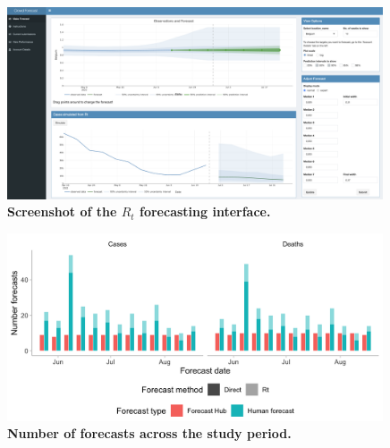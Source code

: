 \documentclass[10pt,a4paper,twocolumn]{article}
\begin{document}
\begin{figure}[H]
\centering
\includegraphics[width=0.99\textwidth]{../output/figures/screenshot-crowd-rt-app.png}
\caption{\bf{Screenshot of the $R_t$ forecasting interface.}}
\label{fig:screenshot-rt}
\end{figure}

\begin{figure}[H]
\centering
\includegraphics[width=0.99\textwidth]{../output/figures/num-forecasters.png}
\caption{\bf{Number of forecasts across the study period.}}
\label{fig:num-forecasters}
\end{figure}


\clearpage

{\small
}

\bigskip





\end{document}
